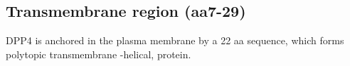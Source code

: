 \subsection{Transmembrane region (aa7-29)}

DPP4 is anchored in the plasma membrane by a 22 aa sequence, which forms polytopic transmembrane \alpha-helical, protein. \cite{Hong_1990}